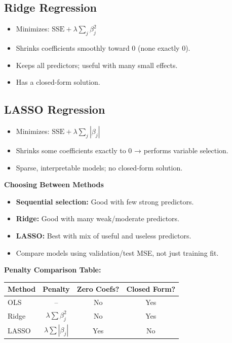 \documentclass[10pt, landscape]{article}
\begin{document}
\begin{multicols}{3}
\subsection{Ridge Regression}
\begin{itemize}[noitemsep]
    \item Minimizes: \( \text{SSE} + \lambda \sum_j \beta_j^2 \)
    \item Shrinks coefficients smoothly toward 0 (none exactly 0).
    \item Keeps all predictors; useful with many small effects.
    \item Has a closed-form solution.
\end{itemize}

\subsection{LASSO Regression}
\begin{itemize}[noitemsep]
    \item Minimizes: \( \text{SSE} + \lambda \sum_j |\beta_j| \)
    \item Shrinks some coefficients exactly to 0 → performs variable selection.
    \item Sparse, interpretable models; no closed-form solution.
\end{itemize}


\vspace{0.3em}
\textbf{Choosing Between Methods}
\begin{itemize}[noitemsep]
    \item \textbf{Sequential selection:} Good with few strong predictors.
    \item \textbf{Ridge:} Good with many weak/moderate predictors.
    \item \textbf{LASSO:} Best with mix of useful and useless predictors.
    \item Compare models using validation/test MSE, not just training fit.
\end{itemize}

\textbf{Penalty Comparison Table:}

{\scriptsize
\begin{tabular}{|l|c|c|c|}
\hline
\textbf{Method} & \textbf{Penalty} & \textbf{Zero Coefs?} & \textbf{Closed Form?} \\\hline
OLS & -- & No & Yes \\
Ridge & \( \lambda \sum \beta_j^2 \) & No & Yes \\
LASSO & \( \lambda \sum |\beta_j| \) & Yes & No \\\hline
\end{tabular}
}




\end{multicols}
\end{document}
